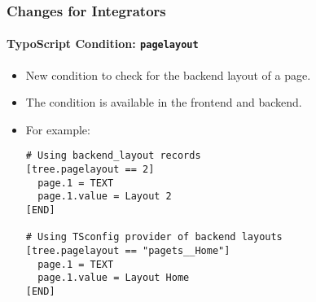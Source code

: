 %

\begin{frame}[fragile]
	\frametitle{Changes for Integrators}
	\framesubtitle{TypoScript Condition: \texttt{pagelayout}}


	\begin{itemize}
		\item New condition to check for the backend layout of a page.
		\item The condition is available in the frontend and backend.
		\item For example:
\begin{lstlisting}
# Using backend_layout records
[tree.pagelayout == 2]
  page.1 = TEXT
  page.1.value = Layout 2
[END]

# Using TSconfig provider of backend layouts
[tree.pagelayout == "pagets__Home"]
  page.1 = TEXT
  page.1.value = Layout Home
[END]
\end{lstlisting}

	\end{itemize}
\end{frame}

